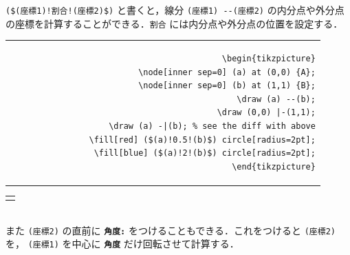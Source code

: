 \documentclass[lualatex]{jlreq}
\begin{document}
\verb|($(座標1)!割合!(座標2)$)| と書くと，線分 \verb|(座標1) --(座標2)| の内分点や外分点の座標を計算することができる．\verb|割合| には内分点や外分点の位置を設定する．
\\[0.5em]
\begin{minipage}{0.58 \textwidth}
    \begin{flushright}
        \begin{tabular}{r}
            \begin{lstlisting}[language={[LaTeX] TeX},
            numbers=none,breaklines=true,gobble=12,frame=none]
            \begin{tikzpicture}
                \node[inner sep=0] (a) at (0,0) {A};
                \node[inner sep=0] (b) at (1,1) {B};
                \draw (a) --(b);
                \draw (0,0) |-(1,1);
                \draw (a) -|(b); % see the diff with above
                \fill[red] ($(a)!0.5!(b)$) circle[radius=2pt];
                \fill[blue] ($(a)!2!(b)$) circle[radius=2pt];
            \end{tikzpicture}
            \end{lstlisting}
        \end{tabular}
    \end{flushright}
\end{minipage}
\hfill
\begin{minipage}{0.34 \textwidth}
    \begin{flushleft}
        \begin{tabular}{l}
            \begin{tikzpicture}
                \node[inner sep=0] (a) at (0,0) {A};
                \node[inner sep=0] (b) at (1,1) {B};
                \draw (a) --(b);
                \draw (0,0) |-(1,1);
                \draw (a) -|(b); %
                \fill[red] ($(a)!0.5!(b)$) circle[radius=2pt];
                \fill[blue] ($(a)!2!(b)$) circle[radius=2pt];
            \end{tikzpicture}
        \end{tabular}
    \end{flushleft}
\end{minipage}
\\[1em]
また \verb|(座標2)| の直前に \textbf{\texttt{角度:}} をつけることもできる．これをつけると \verb|(座標2)| を， \verb|(座標1)| を中心に \textbf{\texttt{角度}} だけ回転させて計算する．
\\[0.5em]
\end{document}

